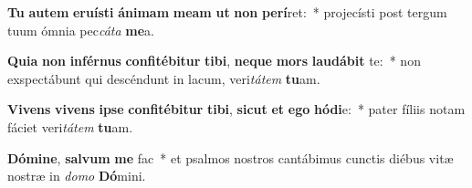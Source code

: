 \item \textbf{Tu} \textbf{au}\textbf{tem} \textbf{e}\textbf{ru}\textbf{ís}\textbf{ti} \textbf{á}\textbf{ni}\textbf{mam} \textbf{me}\textbf{am} \textbf{ut} \textbf{non} \textbf{per}\textbf{í}ret:~* projecísti post tergum tuum ómnia pec\textit{cá}\textit{ta} \textbf{me}a.
\item \textbf{Qui}\textbf{a} \textbf{non} \textbf{in}\textbf{fér}\textbf{nus} \textbf{con}\textbf{fi}\textbf{té}\textbf{bi}\textbf{tur} \textbf{ti}\textbf{bi}, \textbf{ne}\textbf{que} \textbf{mors} \textbf{lau}\textbf{dá}\textbf{bit} te:~* non exspectábunt qui descéndunt in lacum, veri\textit{tá}\textit{tem} \textbf{tu}am.
\item \textbf{Vi}\textbf{vens} \textbf{vi}\textbf{vens} \textbf{ip}\textbf{se} \textbf{con}\textbf{fi}\textbf{té}\textbf{bi}\textbf{tur} \textbf{ti}\textbf{bi}, \textbf{sic}\textbf{ut} \textbf{et} \textbf{e}\textbf{go} \textbf{hó}\textbf{di}e:~* pater fíliis notam fáciet veri\textit{tá}\textit{tem} \textbf{tu}am.
\item \textbf{Dó}\textbf{mi}\textbf{ne}, \textbf{sal}\textbf{vum} \textbf{me} fac~* et psalmos nostros cantábimus cunctis diébus vitæ nostræ in \textit{do}\textit{mo} \textbf{Dó}mini.
